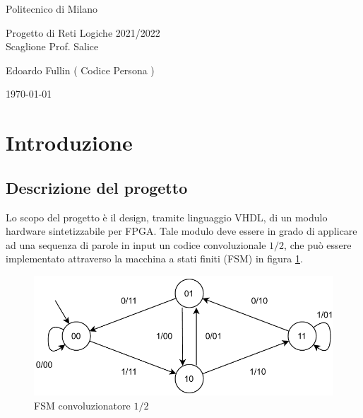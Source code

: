 \documentclass[12pt, a4paper]{article}
\begin{document}
\begin{titlepage}
    \centering

    \vspace{0.5cm} {
        \large Politecnico di Milano\\
    }

    \vspace{5cm} {
        \huge {
            Progetto di Reti Logiche 2021/2022\\
        }
        \vspace{0.5cm}
        \large {Scaglione Prof. Salice}
    }

    \vspace{2cm} {
        \large
        Edoardo Fullin ( Codice Persona )
    }

    \vspace*{\fill}
    \today

\end{titlepage}

\tableofcontents

\pagebreak

\section{Introduzione}

\subsection{Descrizione del progetto}

Lo scopo del progetto è il design, tramite linguaggio VHDL, di un modulo hardware sintetizzabile per FPGA.
Tale modulo deve essere in grado di applicare ad una sequenza di parole in input un codice convoluzionale $1/2$, che 
può essere implementato attraverso la macchina a stati finiti (FSM) in figura \ref{fig:fsm_conv}.


\begin{figure}[!ht]
    \centering
    \includegraphics[scale=0.7]{convoluzionatore_1_2_fsm.png}
    \caption{FSM convoluzionatore $1/2$}
    \label{fig:fsm_conv}
\end{figure}
\end{document}
